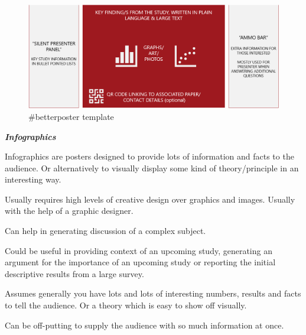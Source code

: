 \documentclass[
]{book}
\begin{document}
\begin{figure}
\centering
\includegraphics{img/Better Poster template.png}
\caption{\#betterposter template}
\end{figure}

\textbf{\emph{Infographics}}

Infographics are posters designed to provide lots of information and facts to the audience. Or alternatively to visually display some kind of theory/principle in an interesting way.

Usually requires high levels of creative design over graphics and images. Usually with the help of a graphic designer.

Can help in generating discussion of a complex subject.

Could be useful in providing context of an upcoming study, generating an argument for the importance of an upcoming study or reporting the initial descriptive results from a large survey.

Assumes generally you have lots and lots of interesting numbers, results and facts to tell the audience. Or a theory which is easy to show off visually.

Can be off-putting to supply the audience with so much information at once.
\end{document}
